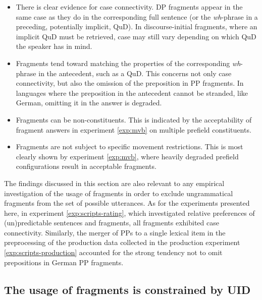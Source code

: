 \begin{itemize}\itemsep0em
 \item There is clear evidence for case connectivity. DP fragments appear in the same case as they do in the corresponding full sentence (or the \textit{wh}-phrase in a preceding, potentially implicit, QuD). In discourse-initial fragments, where an implicit QuD must be retrieved, case may still vary depending on which QuD the speaker has in mind.
 \item Fragments tend toward matching the properties of the corresponding \textit{wh}-phrase in the antecedent, such as a QuD. This concerns not only case connectivity, but also the omission of the preposition in PP fragments. In languages where the preposition in the antecedent cannot be stranded, like German, omitting it in the answer is degraded.
 \item Fragments can be non-constituents. This is indicated by the acceptability of fragment answers in experiment \ref{exp:mvb} on multiple prefield constituents.
 \item Fragments are not subject to specific movement restrictions. This is most clearly shown by experiment \ref{exp:mvb}, where heavily degraded prefield configurations result in acceptable fragments.
\end{itemize}

\newpage
\noindent The findings discussed in this section are also relevant to any empirical investigation of the usage of fragments in order to exclude ungrammatical fragments from the set of possible utterances. As for the experiments presented here, in experiment \ref{exp:scripts-rating}, which investigated relative preferences of (un)predictable sentences and fragments, all fragments exhibited case connectivity. Similarly, the merger of PPs to a single lexical item in the preprocessing of the production data collected in the production experiment \ref{exp:scripts-production} accounted for the strong tendency not to omit prepositions in German PP fragments.

\subsection{The usage of fragments is constrained by UID}

